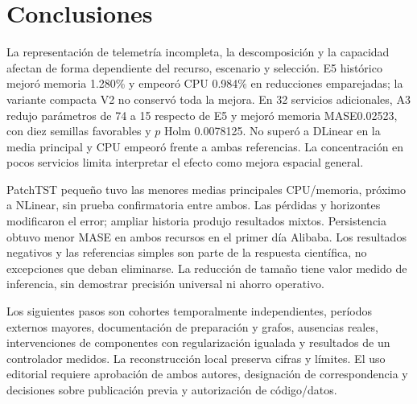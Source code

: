 \section{Conclusiones}
La representación de telemetría incompleta, la descomposición y la capacidad afectan de forma dependiente del recurso, escenario y selección. E5 histórico mejoró memoria 1.280\% y empeoró CPU 0.984\% en reducciones emparejadas; la variante compacta V2 no conservó toda la mejora. En 32 servicios adicionales, A3 redujo parámetros de 74 a 15 respecto de E5 y mejoró memoria MASE0.02523, con diez semillas favorables y $ p $ Holm 0.0078125. No superó a DLinear en la media principal y CPU empeoró frente a ambas referencias. La concentración en pocos servicios limita interpretar el efecto como mejora espacial general.

PatchTST pequeño tuvo las menores medias principales CPU/memoria, próximo a NLinear, sin prueba confirmatoria entre ambos. Las pérdidas y horizontes modificaron el error; ampliar historia produjo resultados mixtos. Persistencia obtuvo menor MASE en ambos recursos en el primer día Alibaba. Los resultados negativos y las referencias simples son parte de la respuesta científica, no excepciones que deban eliminarse. La reducción de tamaño tiene valor medido de inferencia, sin demostrar precisión universal ni ahorro operativo.

Los siguientes pasos son cohortes temporalmente independientes, períodos externos mayores, documentación de preparación y grafos, ausencias reales, intervenciones de componentes con regularización igualada y resultados de un controlador medidos. La reconstrucción local preserva cifras y límites. El uso editorial requiere aprobación de ambos autores, designación de correspondencia y decisiones sobre publicación previa y autorización de código/datos.
